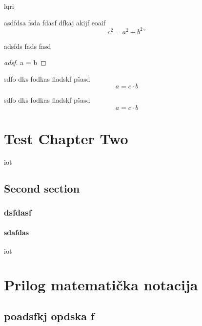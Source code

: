 \documentclass[skripta]{FSBtex}
\begin{document}
\lipsum[1-2]
\acrlong{lqri}
\begin{definition}[Proba]
asdfdsa fsda fdasf dfkaj akijf eoaif
\begin{equation}
c^2 = a^2+b^2ˇ
\end{equation}
\end{definition}

\begin{remark}
adsfds fads fasd 
\end{remark}

\lipsum[1-2]


\begin{proof}[adsf]
a = b
\end{proof}

\begin{exercise}
sdfo dks fodkas fladskf pšasd
\begin{equation}
a = c\cdot b
\end{equation}
\end{exercise}


\begin{example}
sdfo dks fodkas fladskf pšasd
\begin{equation}
a = c\cdot b
\end{equation}
\end{example}





\chapterspaceabove{6.5cm}
\chapter{Test Chapter Two}
\acrlong{iot} \cite{dq_fkm_control}
\section{Second section} 
\subsection{dsfdasf}
\subsubsection{sdafdas}
\acrshort{iot}
\lipsum[5-8]



\LiteraturaPostavke



\appendix
\chapter{Prilog matematička notacija}
\section{poadsfkj opdska f}
\end{document}
